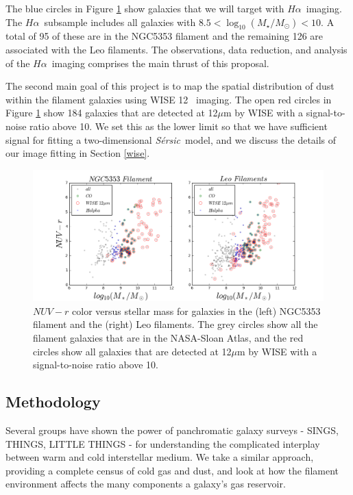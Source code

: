 \documentclass[12pt, preprint]{aastex}
\newcommand{\ha}{$H\alpha$}
\newcommand{\sers}{{\it S\'{e}rsic}}
\begin{document}
The blue circles in Figure \ref{sample} show galaxies that we will
target with \ha \ imaging.   The \ha \ subsample includes all galaxies
with $8.5 < \log_{10} (M_\star/M_\odot) < 10$.  A total of 95 of these
are in the NGC5353 filament and the remaining 126 are associated with
the Leo filaments.  The observations, data reduction, and analysis of
the \ha \ imaging comprises the main thrust of this proposal.

The second main goal of this project is to map the spatial
distribution of dust within the filament galaxies using WISE 12\micron
\ imaging.   The open red circles in Figure \ref{sample} show 184 galaxies that are
detected at 12$\mu$m by WISE with a signal-to-noise ratio above 10.
We set this as the lower limit so that we have sufficient signal for
fitting a two-dimensional \sers \ model, and we discuss the details of
our image fitting in Section \ref{wise}.


\begin{figure}[h]
\includegraphics[width=\textwidth]{sample.png}
\caption{\small $NUV-r$ color versus stellar mass for galaxies 
  in the (left) NGC5353 filament and the (right) Leo filaments.
The grey circles show all the filament galaxies that are in the
NASA-Sloan Atlas, and the red circles show all galaxies that are
detected at 12$\mu$m by WISE with a signal-to-noise ratio above 10.
}
\label{sample}
\end{figure}


\vspace*{-.8cm}\subsection{Methodology} 
\vspace*{-.2cm}
Several groups have shown the power of panchromatic galaxy surveys -
SINGS, THINGS, LITTLE THINGS - for understanding the complicated
interplay between warm and cold interstellar medium.  We take a
similar approach, providing a complete census of cold gas and dust,
and look at how the filament environment affects the many components a galaxy's gas reservoir.
\end{document}
